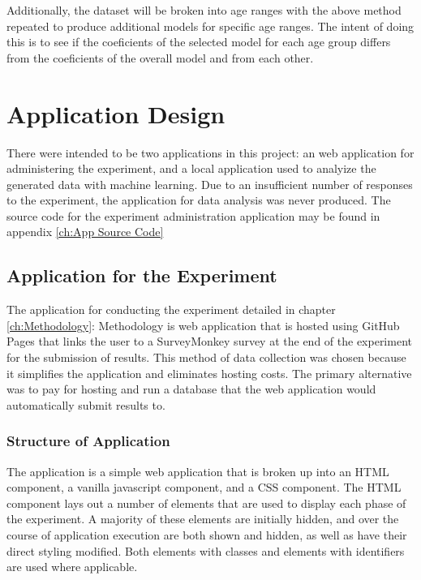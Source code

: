 \documentclass[12pt]{report}
\begin{document}
Additionally, the dataset will be broken into age ranges with the above method repeated to produce additional models for specific age ranges. The intent of doing this is to see if the coeficients of the selected model for each age group differs from the coeficients of the overall model and from each other.

\chapter{Application Design}

There were intended to be two applications in this project: an web application for administering the experiment, and a local application used to analyize the generated data with machine learning. Due to an insufficient number of responses to the experiment, the application for data analysis was never produced. The source code for the experiment administration application may be found in appendix \ref{ch:App Source Code}

\section{Application for the Experiment}

The application for conducting the experiment detailed in chapter \ref{ch:Methodology}: Methodology is web application that is hosted using GitHub Pages that links the user to a SurveyMonkey survey at the end of the experiment for the submission of results. This method of data collection was chosen because it simplifies the application and eliminates hosting costs. The primary alternative was to pay for hosting and run a database that the web application would automatically submit results to.

\subsection{Structure of Application}

The application is a simple web application that is broken up into an HTML component, a vanilla javascript component, and a CSS component. The HTML component lays out a number of elements that are used to display each phase of the experiment. A majority of these elements are initially hidden, and over the course of application execution are both shown and hidden, as well as have their direct styling modified. Both elements with classes and elements with identifiers are used where applicable.
\end{document}

